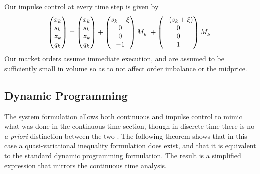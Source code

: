 Our impulse control at every time step is given by
\begin{equation}\label{eq:discretestateimpulse}
\begin{pmatrix}
x_{k} \\
s_{k} \\
\bm{z}_{k} \\
q_{k} 
\end{pmatrix} = \begin{pmatrix}
x_{k} \\
s_{k} \\
\bm{z}_{k} \\
q_{k}
\end{pmatrix}
+ \begin{pmatrix}
s_k - \xi \\
0 \\
0 \\
-1
\end{pmatrix}M_k^-
+ \begin{pmatrix}
- (s_k + \xi) \\
0 \\
0 \\
1
\end{pmatrix} M_k^+
\end{equation}
Our market orders assume immediate execution, and are assumed to be sufficiently small in volume so as to not affect order imbalance or the midprice. 

\subsection{Dynamic Programming}
The system formulation allows both continuous and impulse control to mimic what was done in the continuous time section, though in discrete time there is no \textit{a priori} distinction between the two \citep{Bens08}. The following theorem shows that in this case a quasi-variational inequality formulation does exist, and that it is equivalent to the standard dynamic programming formulation. The result is a simplified expression that mirrors the continuous time analysis.

